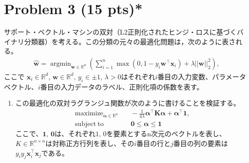 \documentclass{jsarticle}
\DeclareMathOperator*{\argmin}{argmin}
\begin{document}
\section*{Problem 3 (15 pts)*}
サポート・ベクトル・マシンの双対（L2正則化されたヒンジ・ロスに基づくバイナリ分類器）を考える。この分類の元々の最適化問題は，次のように表される。
\begin{align*}
  \hat{\bm w} = \argmin_{\bm w\in \mathbb R^d}\left(\sum_{i=1}^n\max(0, 1 − y_i\bm w^\top \bm x_i) + \lambda||\bm w||_2^2\right),
\end{align*}
ここで $\bm x_i \in \mathbb R^d$, $\bm w \in \mathbb R^d$, $y_i \in {±1}$, $\lambda > 0$はそれぞれ$i$番目の入力変数、パラメータベクトル、$i$番目の入力データのラベル、正則化項の係数を表す。
\begin{enumerate}
  \item この最適化の双対ラグランジュ関数が次のように書けることを検証する。
  \begin{align*}
    \nonumber
    \mathrm{maximize}_{ \bm\alpha\in\mathbb R^n}&\quad − \frac{1}{4\lambda} \bm\alpha^\top\bm K\bm\alpha + \bm\alpha^\top\bm 1,  \\
    \mathrm{subject\ to}&\quad \bm 0\le\bm\alpha\le\bm 1
  \end{align*}
  ここで、$\bm 1$, $\bm 0$は、それぞれ$1$, $0$を要素とするn次元のベクトルを表し、$K \in \mathbb R^{n×n}$は対称正方行列を表し、その$i$番目の行と$j$番目の列の要素は$y_iy_j\bm x_i^\top\bm x_j$である。


\end{enumerate}
\end{document}
